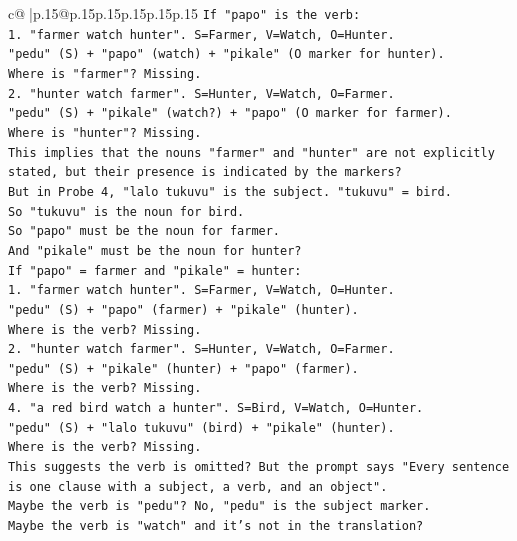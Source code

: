 \documentclass{article}
\begin{document}
{\begin{supertabular}{c@{$\;$}|p{.15\linewidth}@{}p{.15\linewidth}p{.15\linewidth}p{.15\linewidth}p{.15\linewidth}p{.15\linewidth}}
{{{\texttt{If "papo" is the verb:} \\
\texttt{1. "farmer watch hunter". S=Farmer, V=Watch, O=Hunter.} \\
\texttt{"pedu" (S) + "papo" (watch) + "pikale" (O marker for hunter).} \\
\texttt{Where is "farmer"? Missing.} \\
\texttt{2. "hunter watch farmer". S=Hunter, V=Watch, O=Farmer.} \\
\texttt{"pedu" (S) + "pikale" (watch?) + "papo" (O marker for farmer).} \\
\texttt{Where is "hunter"? Missing.} \\
\texttt{This implies that the nouns "farmer" and "hunter" are not explicitly stated, but their presence is indicated by the markers?} \\
\texttt{But in Probe 4, "lalo tukuvu" is the subject. "tukuvu" = bird.} \\
\texttt{So "tukuvu" is the noun for bird.} \\
\texttt{So "papo" must be the noun for farmer.} \\
\texttt{And "pikale" must be the noun for hunter?} \\
\texttt{If "papo" = farmer and "pikale" = hunter:} \\
\texttt{1. "farmer watch hunter". S=Farmer, V=Watch, O=Hunter.} \\
\texttt{"pedu" (S) + "papo" (farmer) + "pikale" (hunter).} \\
\texttt{Where is the verb? Missing.} \\
\texttt{2. "hunter watch farmer". S=Hunter, V=Watch, O=Farmer.} \\
\texttt{"pedu" (S) + "pikale" (hunter) + "papo" (farmer).} \\
\texttt{Where is the verb? Missing.} \\
\texttt{4. "a red bird watch a hunter". S=Bird, V=Watch, O=Hunter.} \\
\texttt{"pedu" (S) + "lalo tukuvu" (bird) + "pikale" (hunter).} \\
\texttt{Where is the verb? Missing.} \\
\texttt{This suggests the verb is omitted? But the prompt says "Every sentence is one clause with a subject, a verb, and an object".} \\
\texttt{Maybe the verb is "pedu"? No, "pedu" is the subject marker.} \\
\texttt{Maybe the verb is "watch" and it's not in the translation?} \\
}}}
\end{supertabular}}
\end{document}
